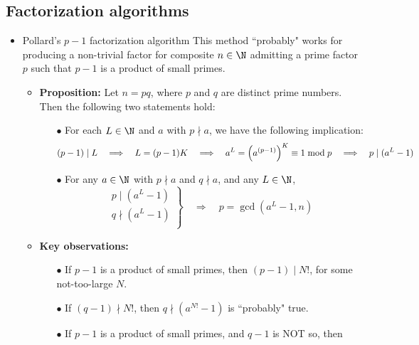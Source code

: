 \subsection{Factorization algorithms}

\begin{itemize}
\item	Pollard's $p-1$ factorization algorithm
		\vskip 0.1cm
		This method {\color{red}``probably"} works for producing a non-trivial factor for composite $n \in \N$
		admitting a prime factor $p$ such that {\color{red}$p-1$ is a product of small primes.}
		\begin{itemize}
		\item	\textbf{Proposition:}\quad
				Let $n = pq$, where $p$ and $q$ are distinct prime numbers.
				Then the following two statements hold:
				\begin{itemize}
				\item[$\bullet$]	For each $L \in \N$ and $a$ with $p \nmid a$, we have the following implication:
								\begin{equation*}
								(p-1) \mid L
								\quad \Longrightarrow \quad L = (p-1)K
								\quad \Longrightarrow \quad a^{L}  = \left(a^{(p-1)}\right)^{K} \equiv 1 \;\textnormal{mod}\; p
								\quad \Longrightarrow \quad p \mid (a^{L} - 1)
								\end{equation*}				
				\item[$\bullet$]	For any $a \in \N$ with $p \nmid a$ and $q \nmid a$, and any $L \in \N$, 
								\begin{equation*}
								\left.\begin{array}{l}
								p \mid (a^{L} - 1) \\
								q \nmid (a^{L} -1) \\
								\end{array}\right\}
								\quad\Longrightarrow\quad
								p = \gcd(a^{L}-1,n)
								\end{equation*}
				\end{itemize}
		\item	\textbf{Key observations:}
				\begin{itemize}
				\item[$\bullet$]	If $p-1$ is a product of small primes, then $(p-1) \mid N!$, for some not-too-large $N$.  
				\item[$\bullet$]	If $(q-1) \nmid N!$, then $q \nmid (a^{N!}-1)$ is ``probably" true.
				\item[$\bullet$]	If $p-1$ is a product of small primes, and $q-1$ is NOT so, then

\end{itemize}
\end{itemize}
\end{itemize}
